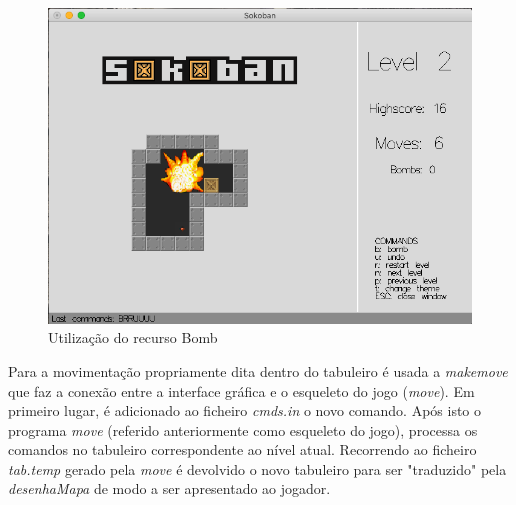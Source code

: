 \documentclass[12pt,a4paper]{report}
\begin{document}
\begin{figure}[h]
  \centering
  \includegraphics[scale=0.45]{images/print2.png}
  \caption{Utilização do recurso Bomb}
\end{figure}

Para a movimentação propriamente dita dentro do tabuleiro é usada a \emph{makemove} que faz a conexão entre a interface gráfica e o esqueleto do jogo (\emph{move}). Em primeiro lugar, é adicionado ao ficheiro \emph{cmds.in} o novo comando. Após isto o programa \emph{move} (referido anteriormente como esqueleto do jogo), processa os comandos no tabuleiro correspondente ao nível atual. Recorrendo ao ficheiro \emph{tab.temp} gerado pela \emph{move} é devolvido o novo tabuleiro para ser "traduzido" pela \emph{desenhaMapa} de modo a ser apresentado ao jogador.\\
\end{document}
